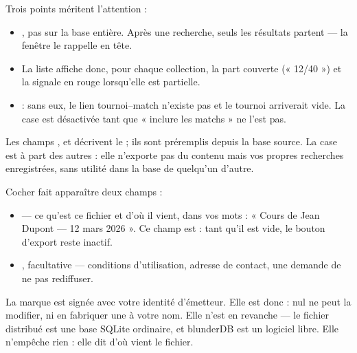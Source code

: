\documentclass[letterpaper,10pt,french]{sphinxmanual}
\begin{document}
\sphinxAtStartPar
Trois points méritent l’attention :
\begin{itemize}
\item {} 
\sphinxAtStartPar
{}, pas sur la base
entière. Après une recherche, seuls les résultats partent — la fenêtre le
rappelle en tête.

\item {} 
\sphinxAtStartPar
{} La liste affiche donc, pour chaque collection, la part
couverte (« 12/40 ») et la signale en rouge lorsqu’elle est partielle.

\item {} 
\sphinxAtStartPar
{} : sans eux, le
lien tournoi–match n’existe pas et le tournoi arriverait vide. La case est
désactivée tant que « inclure les matchs » ne l’est pas.

\end{itemize}

\sphinxAtStartPar
Les champs ,  et  décrivent le  ; ils sont préremplis depuis la base source. La case  est à part des autres : elle n’exporte pas du contenu mais vos
propres recherches enregistrées, sans utilité dans la base de quelqu’un
d’autre.

\sphinxAtStartPar
Cocher  fait apparaître deux champs :
\begin{itemize}
\item {} 
\sphinxAtStartPar
{} — ce qu’est ce fichier et d’où il vient, dans vos mots :
« Cours de Jean Dupont — 12 mars 2026 ». Ce champ est  : tant
qu’il est vide, le bouton d’export reste inactif.

\item {} 
\sphinxAtStartPar
{}, facultative — conditions d’utilisation, adresse de contact, une
demande de ne pas rediffuser.

\end{itemize}

\sphinxAtStartPar
La marque est signée avec votre identité d’émetteur. Elle est donc
 : nul ne peut la modifier, ni en fabriquer une
à votre nom. Elle n’est en revanche  — le fichier distribué
est une base SQLite ordinaire, et blunderDB est un logiciel libre. Elle
n’empêche rien : elle dit d’où vient le fichier.
\end{document}
